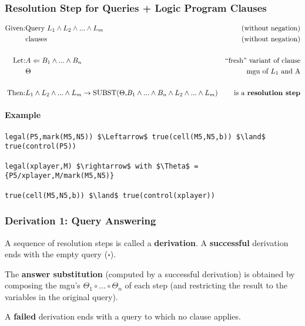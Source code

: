 \subsubsection{Resolution Step for Queries + Logic Program Clauses}
\begin{align*}
    \text{Given:} & \text{Query } L_1 \land L_2 \land ... \land L_m & \text{(without negation)}\\
                  & \text{clauses}                          & \text{(without negation)}\\
\\
    \text{Let:}   & A \Leftarrow B_1 \land ... \land B_n          & \text{``fresh'' variant of clause}\\
                  & \Theta                                  & \text{mgu of $L_1$ and A}\\
\\
    \text{Then:}  & L_1 \land L_2 \land ... \land L_m \rightarrow \text{SUBST($\Theta$,$B_1 \land ... \land B_n \land L_2 \land ... \land L_m$)} & \text{is a \textbf{resolution step}}\\
\end{align*}

\paragraph{Example}
\begin{lstlisting}
legal(P5,mark(M5,N5)) $\Leftarrow$ true(cell(M5,N5,b)) $\land$ true(control(P5))

legal(xplayer,M) $\rightarrow$ with $\Theta$ = {P5/xplayer,M/mark(M5,N5)}

true(cell(M5,N5,b)) $\land$ true(control(xplayer))
\end{lstlisting}

\subsubsection{Derivation 1: Query Answering}
A sequence of resolution steps is called a \textbf{derivation}. A
\textbf{successful} derivation ends with the empty query ($\square$).

The \textbf{answer substitution} (computed by a successful derivation) is
obtained by composing the mgu's $\Theta_1 \circ ... \circ \Theta_n$ of each
step (and restricting the result to the variables in the original query).

A \textbf{failed} derivation ends with a query to which no clause applies.

